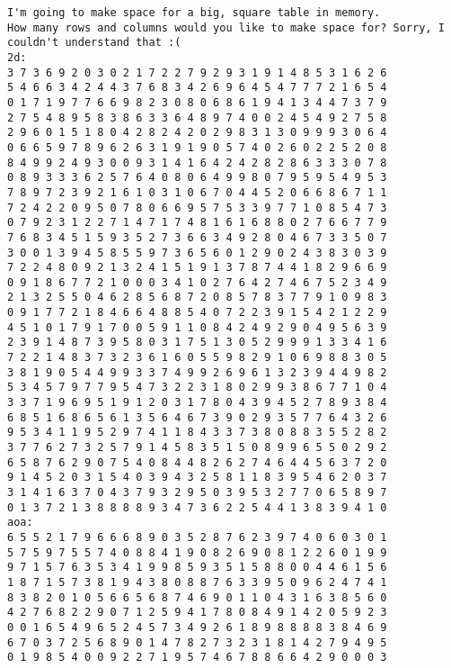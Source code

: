 \documentclass[11pt]{article}
\begin{document}
\begin{verbatim}
I'm going to make space for a big, square table in memory.
How many rows and columns would you like to make space for? Sorry, I couldn't understand that :(
2d:
3 7 3 6 9 2 0 3 0 2 1 7 2 2 7 9 2 9 3 1 9 1 4 8 5 3 1 6 2 6 
5 4 6 6 3 4 2 4 4 3 7 6 8 3 4 2 6 9 6 4 5 4 7 7 7 2 1 6 5 4 
0 1 7 1 9 7 7 6 6 9 8 2 3 0 8 0 6 8 6 1 9 4 1 3 4 4 7 3 7 9 
2 7 5 4 8 9 5 8 3 8 6 3 3 6 4 8 9 7 4 0 0 2 4 5 4 9 2 7 5 8 
2 9 6 0 1 5 1 8 0 4 2 8 2 4 2 0 2 9 8 3 1 3 0 9 9 9 3 0 6 4 
0 6 6 5 9 7 8 9 6 2 6 3 1 9 1 9 0 5 7 4 0 2 6 0 2 2 5 2 0 8 
8 4 9 9 2 4 9 3 0 0 9 3 1 4 1 6 4 2 4 2 8 2 8 6 3 3 3 0 7 8 
0 8 9 3 3 3 6 2 5 7 6 4 0 8 0 6 4 9 9 8 0 7 9 5 9 5 4 9 5 3 
7 8 9 7 2 3 9 2 1 6 1 0 3 1 0 6 7 0 4 4 5 2 0 6 6 8 6 7 1 1 
7 2 4 2 2 0 9 5 0 7 8 0 6 6 9 5 7 5 3 3 9 7 7 1 0 8 5 4 7 3 
0 7 9 2 3 1 2 2 7 1 4 7 1 7 4 8 1 6 1 6 8 8 0 2 7 6 6 7 7 9 
7 6 8 3 4 5 1 5 9 3 5 2 7 3 6 6 3 4 9 2 8 0 4 6 7 3 3 5 0 7 
3 0 0 1 3 9 4 5 8 5 5 9 7 3 6 5 6 0 1 2 9 0 2 4 3 8 3 0 3 9 
7 2 2 4 8 0 9 2 1 3 2 4 1 5 1 9 1 3 7 8 7 4 4 1 8 2 9 6 6 9 
0 9 1 8 6 7 7 2 1 0 0 0 3 4 1 0 2 7 6 4 2 7 4 6 7 5 2 3 4 9 
2 1 3 2 5 5 0 4 6 2 8 5 6 8 7 2 0 8 5 7 8 3 7 7 9 1 0 9 8 3 
0 9 1 7 7 2 1 8 4 6 6 4 8 8 5 4 0 7 2 2 3 9 1 5 4 2 1 2 2 9 
4 5 1 0 1 7 9 1 7 0 0 5 9 1 1 0 8 4 2 4 9 2 9 0 4 9 5 6 3 9 
2 3 9 1 4 8 7 3 9 5 8 0 3 1 7 5 1 3 0 5 2 9 9 9 1 3 3 4 1 6 
7 2 2 1 4 8 3 7 3 2 3 6 1 6 0 5 5 9 8 2 9 1 0 6 9 8 8 3 0 5 
3 8 1 9 0 5 4 4 9 9 3 3 7 4 9 9 2 6 9 6 1 3 2 3 9 4 4 9 8 2 
5 3 4 5 7 9 7 7 9 5 4 7 3 2 2 3 1 8 0 2 9 9 3 8 6 7 7 1 0 4 
3 3 7 1 9 6 9 5 1 9 1 2 0 3 1 7 8 0 4 3 9 4 5 2 7 8 9 3 8 4 
6 8 5 1 6 8 6 5 6 1 3 5 6 4 6 7 3 9 0 2 9 3 5 7 7 6 4 3 2 6 
9 5 3 4 1 1 9 5 2 9 7 4 1 1 8 4 3 3 7 3 8 0 8 8 3 5 5 2 8 2 
3 7 7 6 2 7 3 2 5 7 9 1 4 5 8 3 5 1 5 0 8 9 9 6 5 5 0 2 9 2 
6 5 8 7 6 2 9 0 7 5 4 0 8 4 4 8 2 6 2 7 4 6 4 4 5 6 3 7 2 0 
9 1 4 5 2 0 3 1 5 4 0 3 9 4 3 2 5 8 1 1 8 3 9 5 4 6 2 0 3 7 
3 1 4 1 6 3 7 0 4 3 7 9 3 2 9 5 0 3 9 5 3 2 7 7 0 6 5 8 9 7 
0 1 3 7 2 1 3 8 8 8 8 9 3 4 7 3 6 2 2 5 4 4 1 3 8 3 9 4 1 0 
aoa:
6 5 5 2 1 7 9 6 6 6 8 9 0 3 5 2 8 7 6 2 3 9 7 4 0 6 0 3 0 1 
5 7 5 9 7 5 5 7 4 0 8 8 4 1 9 0 8 2 6 9 0 8 1 2 2 6 0 1 9 9 
9 7 1 5 7 6 3 5 3 4 1 9 9 8 5 9 3 5 1 5 8 8 0 0 4 4 6 1 5 6 
1 8 7 1 5 7 3 8 1 9 4 3 8 0 8 8 7 6 3 3 9 5 0 9 6 2 4 7 4 1 
8 3 8 2 0 1 0 5 6 6 5 6 8 7 4 6 9 0 1 1 0 4 3 1 6 3 8 5 6 0 
4 2 7 6 8 2 2 9 0 7 1 2 5 9 4 1 7 8 0 8 4 9 1 4 2 0 5 9 2 3 
0 0 1 6 5 4 9 6 5 2 4 5 7 3 4 9 2 6 1 8 9 8 8 8 8 3 8 4 6 9 
6 7 0 3 7 2 5 6 8 9 0 1 4 7 8 2 7 3 2 3 1 8 1 4 2 7 9 4 9 5 
0 1 9 8 5 4 0 0 9 2 2 7 1 9 5 7 4 6 7 8 8 6 6 4 2 9 0 0 0 3 

\end{verbatim}
\end{document}

